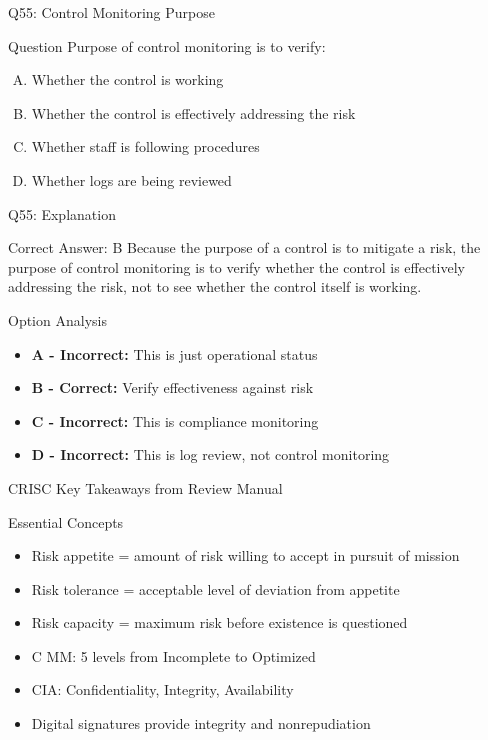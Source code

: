 \documentclass{beamer}
\begin{document}
	\begin{frame}{Q55: Control Monitoring Purpose}
		\begin{block}{Question}
			Purpose of control monitoring is to verify:
		\end{block}
		\begin{enumerate}[(A)]
			\item Whether the control is working
			\item Whether the control is effectively addressing the risk
			\item Whether staff is following procedures
			\item Whether logs are being reviewed
		\end{enumerate}
	\end{frame}
	
	\begin{frame}{Q55: Explanation}
		\begin{block}{Correct Answer: B}
			Because the purpose of a control is to mitigate a risk, the purpose of control monitoring is to verify whether the control is effectively addressing the risk, not to see whether the control itself is working.
		\end{block}
		\begin{block}{Option Analysis}
			\begin{itemize}
				\item \textbf{A - Incorrect:} This is just operational status
				\item \textbf{B - Correct:} Verify effectiveness against risk
				\item \textbf{C - Incorrect:} This is compliance monitoring
				\item \textbf{D - Incorrect:} This is log review, not control monitoring
			\end{itemize}
		\end{block}
	\end{frame}
	
	
	\begin{frame}{CRISC Key Takeaways from Review Manual}
		\begin{block}{Essential Concepts}
			\begin{itemize}
				\item Risk appetite = amount of risk willing to accept in pursuit of mission
				\item Risk tolerance = acceptable level of deviation from appetite
				\item Risk capacity = maximum risk before existence is questioned
				\item C MM: 5 levels from Incomplete to Optimized
				\item CIA: Confidentiality, Integrity, Availability
				\item Digital signatures provide integrity and nonrepudiation
			\end{itemize}
		\end{block}
	\end{frame}
	
\end{document}
